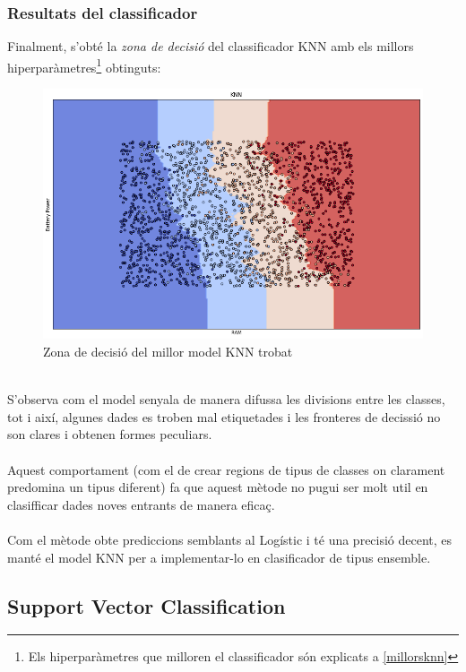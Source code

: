 \documentclass[a4paper, 11pt]{article}
\begin{document}
\subsubsection{Resultats del classificador}\label{zona_knn}
Finalment, s'obté la \textit{zona de decisió} del classificador KNN amb els millors hiperparàmetres\footnote{Els hiperparàmetres que milloren el classificador són explicats a \textcolor{blue}{\ref{millorsknn}}} obtinguts:\\
\begin{figure}[h]
    \centering
    \includegraphics[width = 1\textwidth]{ZonasModelos/zona_knn.png}
    \caption{Zona de decisió del millor model KNN trobat}
    \label{fig:my_label}
\end{figure}\\
S'observa com el model senyala de manera difussa les divisions entre les classes, tot i així, algunes dades es troben mal etiquetades i les fronteres de decissió no son clares i obtenen formes peculiars.\\\\
Aquest comportament (com el de crear regions de tipus de classes on clarament predomina un tipus diferent) fa que aquest mètode no pugui ser molt util en clasifficar dades noves entrants de manera eficaç.\\\\
Com el mètode obte prediccions semblants al Logístic i té una precisió decent, es manté el model KNN per a implementar-lo en clasificador de tipus ensemble.
\newpage



\subsection{Support Vector Classification}\label{SVC}
\end{document}
